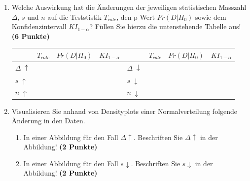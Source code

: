 \documentclass[a4paper, 10pt]{scrartcl}\usepackage[]{graphicx}\usepackage[]{xcolor}
\begin{document}
\begin{enumerate}
\item Welche Auswirkung hat die {\"A}nderungen der jeweiligen statistischen
  Masszahl $\Delta$, $s$ und $n$ auf die Teststistik $T_{calc}$, den p-Wert
  $Pr(D|H_0)$ sowie dem Konfidenzintervall $KI_{1-\alpha}$? F{\"u}llen
Sie hierzu die untenstehende Tabelle aus! \textbf{(6 Punkte)}
\begin{center}
  \large
  \begin{tabular}[c]{l|c|c|c|l|c|c|c}
    & $T_{calc}$ & $Pr(D|H_0)$ & $KI_{1-\alpha}$ & & $T_{calc}$ & $Pr(D|H_0)$ & $KI_{1-\alpha}$\strut\\ 
    \hline
    \textbf{$\Delta\; \uparrow$} & \hspace{1.8cm} & \hspace{1.8cm}  & \hspace{1.8cm} & \textbf{
                                                          $\Delta\; \downarrow$} &
                                                                          \hspace{1.8cm} & \hspace{1.8cm}  & \hspace{1.8cm}\strut\\
    \hline
        \textbf{$s\; \uparrow$} & \hspace{1.8cm} & \hspace{1.8cm}  & \hspace{1.8cm} & \textbf{
                                                          $s\; \downarrow$} &
                                                                          \hspace{1.8cm}
                                                & \hspace{1.8cm}  & \hspace{1.8cm}\strut\\
    \hline
        \textbf{$n\; \uparrow$} & \hspace{1.8cm} & \hspace{1.8cm}  & \hspace{1.8cm} & \textbf{
                                                          $n\; \downarrow$} &
                                                                          \hspace{1.8cm}
                                                & \hspace{1.8cm}  & \hspace{1.8cm}\strut\\
    \hline
  \end{tabular}
\end{center}
\item Visualisieren Sie anhand von Densityplots einer Normalverteilung folgende {\"A}nderung in den
  Daten.  
  \begin{enumerate}
  \item In einer Abbildung f{\"u}r den Fall $\Delta\uparrow$. Beschriften Sie
    $\Delta\uparrow$ in der Abbildung! \textbf{(2 Punkte)}
  \item In einer Abbildung f{\"u}r den Fall $s\downarrow$. Beschriften Sie
    $s\downarrow$ in der Abbildung! \textbf{(2 Punkte)}
  \end{enumerate}
\end{enumerate} 
\end{document}
